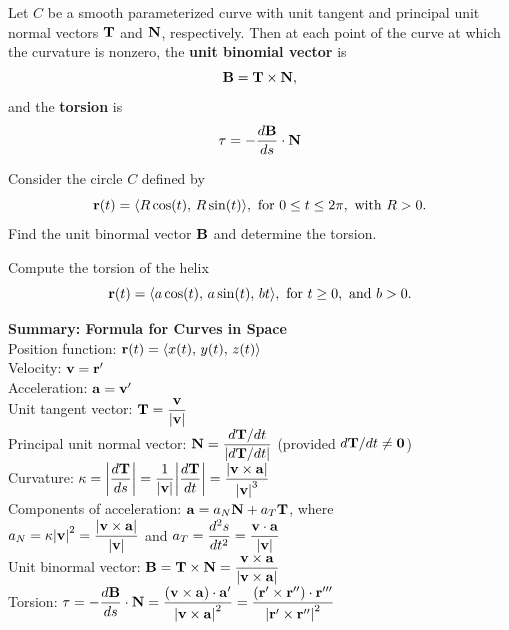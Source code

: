\documentclass[mathNotesPreamble]{subfiles}
\begin{document}
  \begin{defn*}
    Let $C$ be a smooth parameterized curve with unit tangent and principal unit normal vectors ${\mathbf{T}}$ and ${\mathbf{N}}$, respectively. Then at each point of the curve at which the curvature is nonzero, the \textbf{unit binomial vector} is
      \[{\mathbf{B}}={\mathbf{T}}\times{\mathbf{N}},\]
    and the \textbf{torsion} is
      \[\tau=-\frac{d{\mathbf{B}}}{ds}\cdot{\mathbf{N}}\]
  \end{defn*}
  \pagebreak

  \begin{ex*}
    Consider the circle $C$ defined by
      \[{\mathbf{r}}(t)={\left\langle R\cos(t),\,R\sin(t) \right\rangle}, \textnormal{ for }0\leq t\leq 2\pi,\textnormal{ with }R>0.\]
    Find the unit binormal vector ${\mathbf{B}}$ and determine the torsion.
  \end{ex*}

  \begin{ex*}
    Compute the torsion of the helix
      \[{\mathbf{r}}(t)={\left\langle a\cos(t),\,a\sin(t),\,bt \right\rangle}, \textnormal{ for }t\geq 0,\textnormal{ and }b>0.\]
  \end{ex*}

  \pagebreak

  \begin{thmBox*}
    \textbf{Summary: Formula for Curves in Space}\\
    Position function: \tab ${\mathbf{r}}(t)={\left\langle x(t),\,y(t),\,z(t) \right\rangle}$\\[\baselineskip]
    Velocity: \tab ${\mathbf{v}}={\mathbf{r}}'$\\[\baselineskip]
    Acceleration: \tab ${\mathbf{a}}={\mathbf{v}}'$\\[\baselineskip]
    Unit tangent vector: \tab $\displaystyle{\mathbf{T}}=\frac{{\mathbf{v}}}{{\left\vert{\mathbf{v}}\right\vert}}$\\[\baselineskip]
    Principal unit normal vector: \tab $\displaystyle{\mathbf{N}}=\frac{d{\mathbf{T}}/dt}{{\left\vert d{\mathbf{T}}/dt\right\vert}}$ (provided $d{\mathbf{T}}/dt\neq \mathbf{0}$)\\[\baselineskip]
    Curvature: \tab $\displaystyle\kappa={\left\vert\frac{d{\mathbf{T}}}{ds}\right\vert}=\frac{1}{{\left\vert{\mathbf{v}}\right\vert}}{\left\vert\frac{d{\mathbf{T}}}{dt}\right\vert}=\frac{{\left\vert{\mathbf{v}}\times{\mathbf{a}}\right\vert}}{{\left\vert{\mathbf{v}}\right\vert}^3}$\\[\baselineskip]
    Components of acceleration: \tab ${\mathbf{a}}=a_N{\mathbf{N}}+a_T{\mathbf{T}}$, where\\[\baselineskip]
    \mbox{}\tab $\displaystyle a_N=\kappa{\left\vert{\mathbf{v}}\right\vert}^2=\frac{{\left\vert{\mathbf{v}}\times{\mathbf{a}}\right\vert}}{{\left\vert{\mathbf{v}}\right\vert}}$ and $\displaystyle a_T=\frac{d^2s}{dt^2}=\frac{{\mathbf{v}}\cdot{\mathbf{a}}}{{\left\vert{\mathbf{v}}\right\vert}}$\\[1.5\baselineskip]
    Unit binormal vector: \tab $\displaystyle{\mathbf{B}}={\mathbf{T}}\times{\mathbf{N}}=\frac{{\mathbf{v}}\times{\mathbf{a}}}{{\left\vert{\mathbf{v}}\times{\mathbf{a}}\right\vert}}$\\[\baselineskip]
    Torsion: \tab $\displaystyle\tau=-\frac{d{\mathbf{B}}}{ds}\cdot{\mathbf{N}}=\frac{{\left({\mathbf{v}}\times{\mathbf{a}}\right)}\cdot{\mathbf{a}}'}{{\left\vert{\mathbf{v}}\times{\mathbf{a}}\right\vert}^2}=\frac{{\left({\mathbf{r}}'\times{\mathbf{r}}''\right)}\cdot{\mathbf{r}}'''}{{\left\vert{\mathbf{r}}'\times{\mathbf{r}}''\right\vert}^2}$
  \end{thmBox*}

  \pagebreak
  
\end{document}
